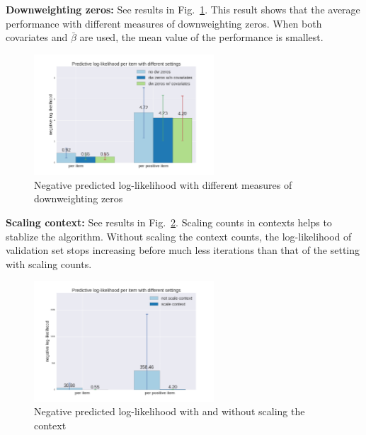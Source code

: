 \documentclass{article}
\begin{document}
{\bf Downweighting zeros:} See results in Fig.~\ref{fig_dwz}. This result shows that the average performance with different measures of downweighting zeros. When both covariates and $\bar{\beta}$ are used, the mean value of the performance is smallest.   

\begin{figure}[t]
    \centering
    \includegraphics[width=0.6\textwidth]{figures/dwz.png}
    \caption{Negative predicted log-likelihood with different measures of downweighting zeros}
    \label{fig_dwz}
\end{figure}


{\bf Scaling context:} See results in Fig.~\ref{fig_scaling}. Scaling counts in contexts helps to stablize the algorithm. Without scaling the context counts, the log-likelihood of validation set stops increasing before much less iterations than that of the setting with scaling counts. 
\begin{figure}[t]
    \centering
    \includegraphics[width=0.6\textwidth]{figures/scale_context.png}
    \caption{Negative predicted log-likelihood with and without scaling the context}
    \label{fig_scaling}
\end{figure}
\end{document}
